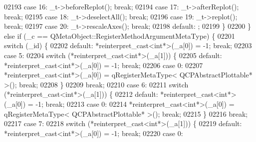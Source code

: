 \begin{DoxyCode}
02193         \textcolor{keywordflow}{case} 16: \_t->beforeReplot(); \textcolor{keywordflow}{break};
02194         \textcolor{keywordflow}{case} 17: \_t->afterReplot(); \textcolor{keywordflow}{break};
02195         \textcolor{keywordflow}{case} 18: \_t->deselectAll(); \textcolor{keywordflow}{break};
02196         \textcolor{keywordflow}{case} 19: \_t->replot(); \textcolor{keywordflow}{break};
02197         \textcolor{keywordflow}{case} 20: \_t->rescaleAxes(); \textcolor{keywordflow}{break};
02198         \textcolor{keywordflow}{default}: ;
02199         \}
02200     \} \textcolor{keywordflow}{else} \textcolor{keywordflow}{if} (\_c == QMetaObject::RegisterMethodArgumentMetaType) \{
02201         \textcolor{keywordflow}{switch} (\_id) \{
02202         \textcolor{keywordflow}{default}: *\textcolor{keyword}{reinterpret\_cast<}\textcolor{keywordtype}{int}*\textcolor{keyword}{>}(\_a[0]) = -1; \textcolor{keywordflow}{break};
02203         \textcolor{keywordflow}{case} 5:
02204             \textcolor{keywordflow}{switch} (*reinterpret\_cast<int*>(\_a[1])) \{
02205             \textcolor{keywordflow}{default}: *\textcolor{keyword}{reinterpret\_cast<}\textcolor{keywordtype}{int}*\textcolor{keyword}{>}(\_a[0]) = -1; \textcolor{keywordflow}{break};
02206             \textcolor{keywordflow}{case} 0:
02207                 *\textcolor{keyword}{reinterpret\_cast<}\textcolor{keywordtype}{int}*\textcolor{keyword}{>}(\_a[0]) = qRegisterMetaType< QCPAbstractPlottable* >(); \textcolor{keywordflow}{break};
02208             \}
02209             \textcolor{keywordflow}{break};
02210         \textcolor{keywordflow}{case} 6:
02211             \textcolor{keywordflow}{switch} (*reinterpret\_cast<int*>(\_a[1])) \{
02212             \textcolor{keywordflow}{default}: *\textcolor{keyword}{reinterpret\_cast<}\textcolor{keywordtype}{int}*\textcolor{keyword}{>}(\_a[0]) = -1; \textcolor{keywordflow}{break};
02213             \textcolor{keywordflow}{case} 0:
02214                 *\textcolor{keyword}{reinterpret\_cast<}\textcolor{keywordtype}{int}*\textcolor{keyword}{>}(\_a[0]) = qRegisterMetaType< QCPAbstractPlottable* >(); \textcolor{keywordflow}{break};
02215             \}
02216             \textcolor{keywordflow}{break};
02217         \textcolor{keywordflow}{case} 7:
02218             \textcolor{keywordflow}{switch} (*reinterpret\_cast<int*>(\_a[1])) \{
02219             \textcolor{keywordflow}{default}: *\textcolor{keyword}{reinterpret\_cast<}\textcolor{keywordtype}{int}*\textcolor{keyword}{>}(\_a[0]) = -1; \textcolor{keywordflow}{break};
02220             \textcolor{keywordflow}{case} 0:

\end{DoxyCode}
